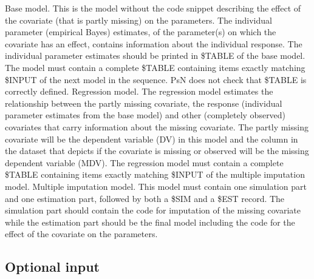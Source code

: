 \begin{optionlist}
Base model. This is the model without the code snippet describing the effect of the covariate (that is partly missing) on the parameters. The individual parameter (empirical Bayes) estimates, of the parameter(s) on which the covariate has an effect, contains information about the individual response. The individual parameter estimates should be printed in \$TABLE of the base model.\\ The model must contain a complete \$TABLE containing items exactly matching \$INPUT of the next model in the sequence. PsN does not check that \$TABLE is correctly defined.  
\nextopt
{}
Regression model.  The regression model estimates the relationship between the partly missing covariate, the response (individual parameter estimates from the base model) and other (completely observed) covariates that carry information about the missing covariate. The partly missing covariate will be the dependent variable (DV) in this model and the column in the dataset that depicts if the covariate is missing or observed will be the missing dependent variable (MDV). The regression model must contain a complete \$TABLE containing items exactly matching \$INPUT of the multiple imputation model. 
\nextopt
{}
Multiple imputation model. This model must contain one simulation part and one estimation part, followed by both a \$SIM and a \$EST record. The simulation part should contain the code for imputation of the missing covariate while the estimation part should be the final model including the code for the effect of the covariate on the parameters. 
\nextopt
\end{optionlist}

\subsection{Optional input}

